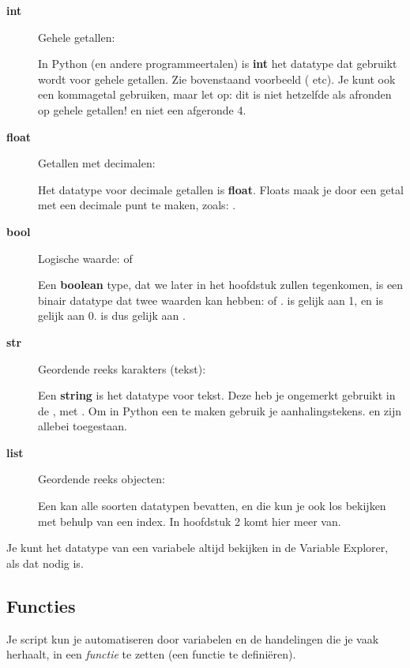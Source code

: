 \documentclass[a4paper,11pt, fleqn]{article}
\begin{document}
\begin{description}
\item[\textbf{int}] Gehele getallen: 

In Python (en andere programmeertalen) is {\bf int} het datatype dat gebruikt wordt voor gehele getallen. Zie bovenstaand voorbeeld ( etc). Je kunt ook een kommagetal gebruiken, maar let op: dit is niet hetzelfde als afronden op gehele getallen!  en niet een afgeronde 4.

\item[\textbf{float}] Getallen met decimalen: 

Het datatype voor decimale getallen is {\bf float}. Floats maak je door een getal met een decimale punt te maken, zoals: .

\item[\textbf{bool}] Logische waarde:  of 

Een {\bf boolean} type, dat we later in het hoofdstuk zullen tegenkomen, is een binair datatype dat twee waarden kan hebben:  of .  is gelijk aan 1, en  is gelijk aan 0.  is dus gelijk aan .

\item[\textbf{str}] Geordende reeks karakters (tekst): 

Een {\bf string} is het datatype voor tekst. Deze heb je ongemerkt gebruikt in de , met . Om in Python een  te maken gebruik je aanhalingstekens.  en  zijn allebei toegestaan.

\item[\textbf{list}] Geordende reeks objecten: \pythoninline{[10, "hello",200.3]}

Een  kan alle soorten datatypen bevatten, en die kun je ook los bekijken met behulp van een index. In hoofdstuk 2 komt hier meer van.

\end{description}

Je kunt het datatype van een variabele altijd bekijken in de Variable Explorer, als dat nodig is.

\subsection{Functies}
Je script kun je automatiseren door variabelen en de handelingen die je vaak herhaalt, in een \textit{functie} te zetten (een functie te defini\"eren).
\end{document}
